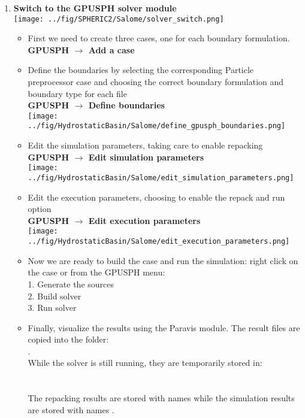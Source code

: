 \documentclass{../GPUSPHtemplate}
\begin{document}
\begin{enumerate}
\item \textbf{Switch to the GPUSPH solver module}  \smallskip\\
  \texttt{[image: ../fig/SPHERIC2/Salome/solver\_switch.png]}
  \begin{itemize}
  \item First we need to create three cases, one for each boundary formulation.\\
    \textbf{GPUSPH $\to$ Add a case}
  \item Define the boundaries by selecting the corresponding Particle preprocessor case and choosing the correct boundary
    formulation and boundary type for each file\\
    \textbf{GPUSPH $\to$ Define boundaries}\smallskip\\
    \texttt{[image: ../fig/HydrostaticBasin/Salome/define\_gpusph\_boundaries.png]}
  \item Edit the simulation parameters, taking care to enable repacking\\
    \textbf{GPUSPH $\to$ Edit simulation parameters}\\
    \texttt{[image: ../fig/HydrostaticBasin/Salome/edit\_simulation\_parameters.png]}
  \item Edit the execution parameters, choosing to enable the repack and run option\\
    \textbf{GPUSPH $\to$ Edit execution parameters}\\
    \texttt{[image: ../fig/HydrostaticBasin/Salome/edit\_execution\_parameters.png]}
  \item Now we are ready to build the case and run the simulation: right click on the case or from the GPUSPH menu:\\
    1. Generate the sources\\
    2. Build solver\\
    3. Run solver
  \item Finally, visualize the results using the Paravis module. The result files are copied into the folder:\\
    .\\ While the solver is still running, they are temporarily stored in:\\
    \\
    \\
    The repacking results are stored with names
     while the simulation results are stored with names .
  \end{itemize}
\end{enumerate}
\end{document}
